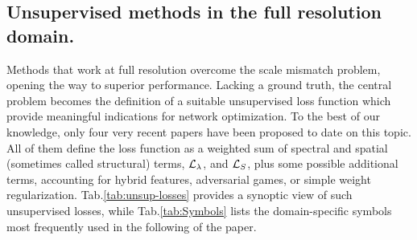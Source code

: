 \documentclass[journal]{IEEEtran}
\newcommand{\LL}{{\cal L}}
\begin{document}
\subsection{Unsupervised methods in the full resolution domain.}
Methods that work at full resolution overcome the scale mismatch problem, opening the way to superior performance.
Lacking a ground truth,
the central problem becomes the definition of a suitable unsupervised loss function
which provide meaningful indications for network optimization.
To the best of our knowledge,
only four very recent papers \cite{Luo2020, Uezato2020, Ma2020, Ciotola2022} have been proposed to date on this topic.
All of them define the loss function as a weighted sum of spectral and spatial (sometimes called structural) terms, $\LL_\lambda$, and $\LL_S$,
plus some possible additional terms, accounting for hybrid features, adversarial games, or simple weight regularization.
Tab.\ref{tab:unsup-losses} provides a synoptic view of such unsupervised losses,
while Tab.\ref{tab:Symbols} lists the domain-specific symbols most frequently used in the following of the paper.


\newcommand{\myrule}[1]{{ $\rule{0mm}{#1}_{\rule{0mm}{#1}}$ }}
\newcommand{\myname}[1]{{ \begin{minipage}{18mm} \center{#1} \end{minipage} }}
\newcommand{\myspec}[1]{{ \begin{minipage}{45mm} \center{#1} \end{minipage} }}
\newcommand{\myspat}[1]{{ \begin{minipage}{36mm} \center{#1} \end{minipage} }}
\newcommand{\mynote}[1]{{ \begin{minipage}{54mm} {#1} \end{minipage} }}
\newcommand{\norm}[1]{{\left\| #1 \right\|}}
\end{document}
